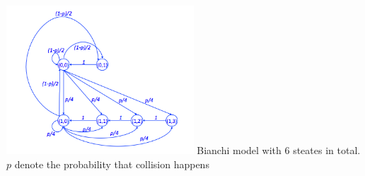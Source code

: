 \documentclass[10pt,a4paper,landscape]{article}
\newenvironment{Figure}
  {\par\medskip\noindent\minipage{\linewidth}}
  {\endminipage\par\medskip}
\begin{document}
\begin{multicols*}{4}
\begin{Figure}
  \includegraphics[width=7cm]{img/banchi.png}
  Bianchi model with 6 steates in total. $p$ denote the probability that collision happens
\end{Figure}
\end{multicols*}
\end{document}
